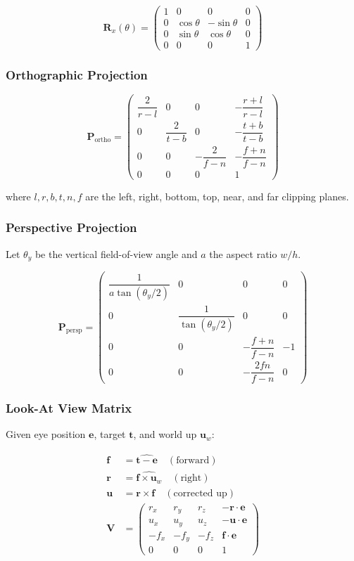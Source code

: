 \documentclass[12pt, a4paper]{report}
\theoremstyle{definition}
\theoremstyle{remark}
\begin{document}
\[
\mathbf{R}_x(\theta) =
\begin{pmatrix}
1 & 0          & 0           & 0 \\
0 & \cos\theta & -\sin\theta & 0 \\
0 & \sin\theta &  \cos\theta & 0 \\
0 & 0          & 0           & 1
\end{pmatrix}
\]

\subsubsection{Orthographic Projection}

\[
\mathbf{P}_\text{ortho} =
\begin{pmatrix}
\dfrac{2}{r-l} & 0 & 0 & -\dfrac{r+l}{r-l} \\[6pt]
0 & \dfrac{2}{t-b} & 0 & -\dfrac{t+b}{t-b} \\[6pt]
0 & 0 & -\dfrac{2}{f-n} & -\dfrac{f+n}{f-n} \\[6pt]
0 & 0 & 0 & 1
\end{pmatrix}
\]

where $l, r, b, t, n, f$ are the left, right, bottom, top, near, and far
clipping planes.

\subsubsection{Perspective Projection}

Let $\theta_y$ be the vertical field-of-view angle and $a$ the
aspect ratio $w/h$.

\[
\mathbf{P}_\text{persp} =
\begin{pmatrix}
\dfrac{1}{a \tan(\theta_y/2)} & 0 & 0 & 0 \\[8pt]
0 & \dfrac{1}{\tan(\theta_y/2)} & 0 & 0 \\[8pt]
0 & 0 & -\dfrac{f+n}{f-n} & -1 \\[4pt]
0 & 0 & -\dfrac{2fn}{f-n} & 0
\end{pmatrix}
\]

\subsubsection{Look-At View Matrix}

Given eye position $\mathbf{e}$, target $\mathbf{t}$, and world up
$\mathbf{u}_w$:

\begin{align}
\mathbf{f} &= \widehat{\mathbf{t} - \mathbf{e}} \quad (\text{forward}) \\
\mathbf{r} &= \widehat{\mathbf{f} \times \mathbf{u}_w} \quad (\text{right}) \\
\mathbf{u} &= \mathbf{r} \times \mathbf{f} \quad (\text{corrected up}) \\
\mathbf{V} &=
\begin{pmatrix}
r_x & r_y & r_z & -\mathbf{r}\cdot\mathbf{e} \\
u_x & u_y & u_z & -\mathbf{u}\cdot\mathbf{e} \\
-f_x & -f_y & -f_z & \mathbf{f}\cdot\mathbf{e} \\
0 & 0 & 0 & 1
\end{pmatrix}
\end{align}
\end{document}
